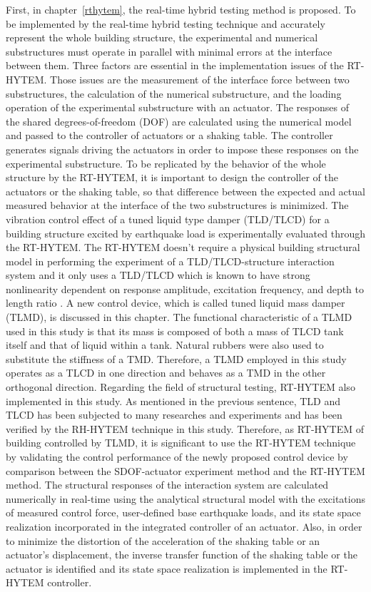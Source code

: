 First, in chapter~\ref{rthytem}, the real-time hybrid testing method is proposed. To be implemented by the real-time hybrid testing technique and accurately represent the whole building structure, the experimental and numerical substructures must operate in parallel with minimal errors at the interface between them. Three factors are essential in the implementation issues of the RT-HYTEM. Those issues are the measurement of the interface force between two substructures, the calculation of the numerical substructure, and the loading operation of the experimental substructure with an actuator. The responses of the shared degrees-of-freedom (DOF) are calculated using the numerical model and passed to the controller of actuators or a shaking table. The controller generates signals driving the actuators in order to impose these responses on the experimental substructure. To be replicated by the behavior of the whole structure by the RT-HYTEM, it is important to design the controller of the actuators or the shaking table, so that difference between the expected and actual measured behavior at the interface of the two substructures is minimized. The vibration control effect of a tuned liquid type damper (TLD/TLCD) for a building structure excited by earthquake load is experimentally evaluated through the RT-HYTEM. The RT-HYTEM doesn’t require a physical building structural model in performing the experiment of a TLD/TLCD-structure interaction system and it only uses a TLD/TLCD which is known to have strong nonlinearity dependent on response amplitude, excitation frequency, and depth to length ratio \citep{yalla2001liquid}. A new control device, which is called tuned liquid mass damper (TLMD), is discussed in this chapter. The functional characteristic of a TLMD used in this study is that its mass is composed of both a mass of TLCD tank itself and that of liquid within a tank. Natural rubbers were also used to substitute the stiffness of a TMD. Therefore, a TLMD employed in this study operates as a TLCD in one direction and behaves as a TMD in the other orthogonal direction. Regarding the field of structural testing, RT-HYTEM also implemented in this study. As mentioned in the previous sentence, TLD and TLCD has been subjected to many researches and experiments and has been verified by the RH-HYTEM technique in this study. Therefore, as RT-HYTEM of building controlled by TLMD, it is significant to use the RT-HYTEM technique by validating the control performance of the newly proposed control device by comparison between the SDOF-actuator experiment method and the RT-HYTEM method. 
The structural responses of the interaction system are calculated numerically in real-time using the analytical structural model with the excitations of measured control force, user-defined base earthquake loads, and its state space realization incorporated in the integrated controller of an actuator. Also, in order to minimize the distortion of the acceleration of the shaking table or an actuator's displacement, the inverse transfer function of the shaking table or the actuator is identified and its state space realization is implemented in the RT-HYTEM controller.

